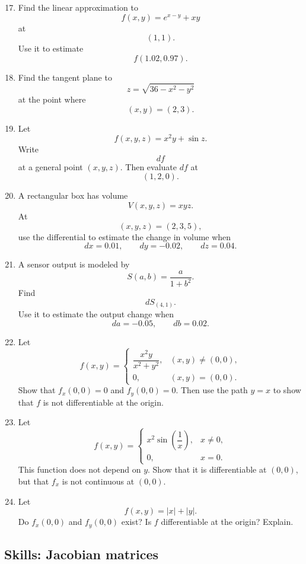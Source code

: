 \begin{enumerate}
\setcounter{enumi}{16}

\item Find the linear approximation to
\[
    f(x,y)=e^{x-y}+xy
\]
at
\[
    (1,1).
\]
Use it to estimate
\[
    f(1.02,0.97).
\]

\item Find the tangent plane to
\[
    z=\sqrt{36-x^2-y^2}
\]
at the point where
\[
    (x,y)=(2,3).
\]

\item Let
\[
    f(x,y,z)=x^2y+\sin z.
\]
Write
\[
    df
\]
at a general point \((x,y,z)\).  Then evaluate \(df\) at
\[
    (1,2,0).
\]

\item A rectangular box has volume
\[
    V(x,y,z)=xyz.
\]
At
\[
    (x,y,z)=(2,3,5),
\]
use the differential to estimate the change in volume when
\[
    dx=0.01,\qquad dy=-0.02,\qquad dz=0.04.
\]

\item A sensor output is modeled by
\[
    S(a,b)=\frac{a}{1+b^2}.
\]
Find
\[
    dS_{(4,1)}.
\]
Use it to estimate the output change when
\[
    da=-0.05,\qquad db=0.02.
\]

\item Let
\[
    f(x,y)=
    \begin{cases}
    \dfrac{x^2y}{x^2+y^2}, & (x,y)\ne(0,0),\\[2mm]
    0, & (x,y)=(0,0).
    \end{cases}
\]
Show that \(f_x(0,0)=0\) and \(f_y(0,0)=0\).  Then use the path \(y=x\) to show
that \(f\) is not differentiable at the origin.

\item Let
\[
    f(x,y)=
    \begin{cases}
    x^2\sin\left(\dfrac1x\right), & x\ne0,\\[2mm]
    0, & x=0.
    \end{cases}
\]
This function does not depend on \(y\).  Show that it is differentiable at \((0,0)\),
but that \(f_x\) is not continuous at \((0,0)\).

\item Let
\[
    f(x,y)=|x|+|y|.
\]
Do \(f_x(0,0)\) and \(f_y(0,0)\) exist?  Is \(f\) differentiable at the origin?
Explain.
\end{enumerate}

\subsection*{Skills: Jacobian matrices}


